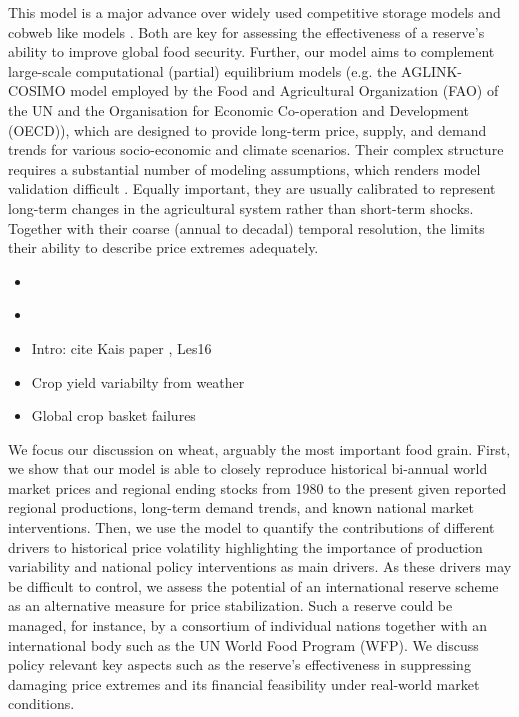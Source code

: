 \documentclass[12pt]{article}
\begin{document}

This model is a major advance over widely used competitive storage models \cite{CAF11} and cobweb like models \cite{MIT12}.  Both are key for assessing the effectiveness of a reserve's ability to improve global food security. Further, our model aims to complement large-scale computational (partial) equilibrium models (e.g. the AGLINK-COSIMO model \cite{OECD15} employed by the Food and Agricultural Organization (FAO) of the UN and the Organisation for Economic Co-operation and Development  (OECD)), which are designed to provide long-term price, supply, and demand trends for various socio-economic and climate scenarios. Their complex structure requires a substantial number of modeling assumptions, which renders model validation difficult \cite{VAL07}. Equally important, they are usually calibrated to represent long-term changes in the agricultural system rather than short-term shocks. Together with their coarse (annual to decadal) temporal resolution, the limits their ability to describe price extremes adequately. 


\begin{itemize}
\item \cite{CAF11,GOU13,LAR13,GOU16,GOU16a,KEY38}
\item \cite{Salent paper from 1983}
\item Intro: cite Kais paper , Les16
\item Crop yield variabilty from weather \cite{RAY15}
\item Global crop basket failures \cite{GAU19}
\end{itemize}


We focus our discussion on wheat, arguably the most important food grain. First, we show that our model is able to closely reproduce historical bi-annual world market prices and regional ending stocks from 1980 to the present given reported regional productions, long-term demand trends, and known national market interventions. Then, we use the model to quantify the contributions of different drivers to historical price volatility highlighting the importance of production variability and national policy interventions as main drivers. As these drivers may be difficult to control, we assess the potential of an international reserve scheme as an alternative measure for price stabilization. Such a reserve could be managed, for instance, by a consortium of individual nations together with an international body such as the UN World Food Program (WFP). We discuss policy relevant key aspects such as the reserve's effectiveness in suppressing damaging price extremes and its financial feasibility under real-world market conditions.
\end{document}
